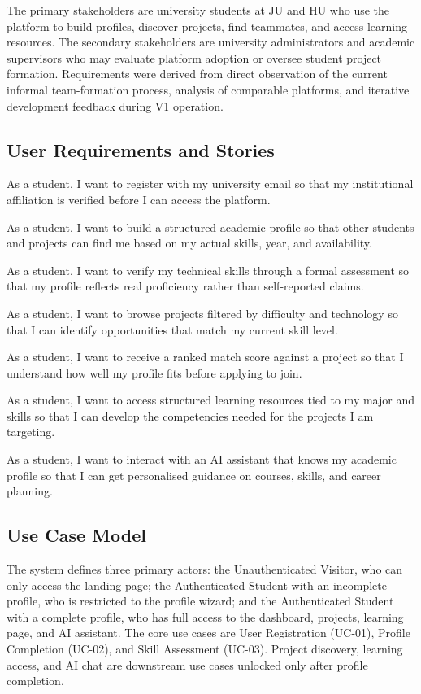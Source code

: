 \documentclass[12pt,a4paper]{article}
\begin{document}
The primary stakeholders are university students at JU and HU who use the platform to
build profiles, discover projects, find teammates, and access learning resources. The
secondary stakeholders are university administrators and academic supervisors who may
evaluate platform adoption or oversee student project formation. Requirements were derived
from direct observation of the current informal team-formation process, analysis of
comparable platforms, and iterative development feedback during V1 operation.

\subsection{User Requirements and Stories}

As a student, I want to register with my university email so that my institutional
affiliation is verified before I can access the platform.

As a student, I want to build a structured academic profile so that other students and
projects can find me based on my actual skills, year, and availability.

As a student, I want to verify my technical skills through a formal assessment so that
my profile reflects real proficiency rather than self-reported claims.

As a student, I want to browse projects filtered by difficulty and technology so that I
can identify opportunities that match my current skill level.

As a student, I want to receive a ranked match score against a project so that I
understand how well my profile fits before applying to join.

As a student, I want to access structured learning resources tied to my major and skills
so that I can develop the competencies needed for the projects I am targeting.

As a student, I want to interact with an AI assistant that knows my academic profile so
that I can get personalised guidance on courses, skills, and career planning.

\subsection{Use Case Model}

The system defines three primary actors: the Unauthenticated Visitor, who can only access
the landing page; the Authenticated Student with an incomplete profile, who is restricted
to the profile wizard; and the Authenticated Student with a complete profile, who has full
access to the dashboard, projects, learning page, and AI assistant. The core use cases
are User Registration (UC-01), Profile Completion (UC-02), and Skill Assessment (UC-03).
Project discovery, learning access, and AI chat are downstream use cases unlocked only
after profile completion.
\end{document}
